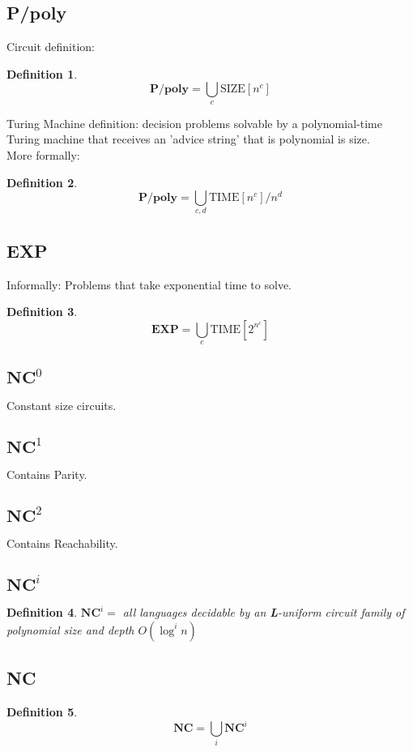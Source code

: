 \documentclass[]{article}
\theoremstyle{break}
\theoremstyle{break}
\newtheorem{definition}{Definition}[section]
\begin{document}
\subsection{P/poly}
\label{sec:ppoly}
Circuit definition:
\begin{definition}
	$$\textbf{P/poly} = \bigcup_c \hyperref[sec:size]{\text{SIZE}[n^c]}$$
\end{definition}
$ $
\\
Turing Machine definition: decision problems solvable by a polynomial-time Turing machine that receives an 'advice string' that is polynomial is size.
\\
More formally:
\begin{definition}
		$$\textbf{P/poly} = \bigcup_{c,d} \hyperref[sec:time]{\text{TIME}[n^c]}/n^d$$
\end{definition}
\subsection{EXP}
Informally: Problems that take exponential time to solve.
\begin{definition}
	$$\textbf{EXP}= \bigcup_c \hyperref[sec:time]{\text{TIME}[2^{n^c}]}$$
\end{definition}
\subsection{$\textbf{NC}^0$}
\label{sec:NC0}
Constant size circuits.
\subsection{$\textbf{NC}^1$}
\label{sec:NC1}
Contains Parity.
\subsection{$\textbf{NC}^2$}
\label{sec:NC2}
Contains Reachability.
\subsection{$\textbf{NC}^i$}
\label{sec:NCi}
\begin{definition}
	$\textbf{NC}^i = $ all languages decidable by an \textbf{L}-uniform circuit family of polynomial size and depth $O(\log^i n)$
\end{definition}
\subsection{NC}
\label{sec:NC}
\begin{definition}
	$$\textbf{NC} = \bigcup_i \hyperref[sec:NCi]{\textbf{NC}^i}$$
\end{definition}
\end{document}
